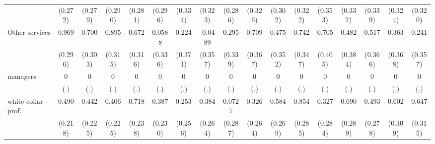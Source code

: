{\begin{tabular}{l*{16}{c}}
                    &     (0.272)         &     (0.279)         &     (0.290)         &     (0.281)         &     (0.296)         &     (0.334)         &     (0.323)         &     (0.286)         &     (0.326)         &     (0.302)         &     (0.322)         &     (0.353)         &     (0.337)         &     (0.339)         &     (0.324)         &     (0.320)         \\
[1em]
Other services      &       0.969\sym{**} &       0.700\sym{*}  &       0.895\sym{**} &       0.672\sym{*}  &      0.0588         &       0.224         &     -0.0489         &       0.295         &       0.709         &       0.475         &       0.742\sym{*}  &       0.705         &       0.482         &       0.517         &       0.363         &       0.241         \\
                    &     (0.296)         &     (0.303)         &     (0.315)         &     (0.316)         &     (0.336)         &     (0.371)         &     (0.357)         &     (0.339)         &     (0.367)         &     (0.352)         &     (0.347)         &     (0.405)         &     (0.384)         &     (0.366)         &     (0.368)         &     (0.357)         \\
[1em]
managers            &           0         &           0         &           0         &           0         &           0         &           0         &           0         &           0         &           0         &           0         &           0         &           0         &           0         &           0         &           0         &           0         \\
                    &         (.)         &         (.)         &         (.)         &         (.)         &         (.)         &         (.)         &         (.)         &         (.)         &         (.)         &         (.)         &         (.)         &         (.)         &         (.)         &         (.)         &         (.)         &         (.)         \\
[1em]
white collar - prof.&       0.490\sym{*}  &       0.442\sym{*}  &       0.406         &       0.718\sym{**} &       0.387         &       0.253         &       0.384         &      0.0727         &       0.326         &       0.584\sym{*}  &       0.854\sym{**} &       0.327         &       0.690\sym{*}  &       0.493         &       0.602         &       0.647\sym{*}  \\
                    &     (0.218)         &     (0.225)         &     (0.225)         &     (0.238)         &     (0.230)         &     (0.256)         &     (0.264)         &     (0.287)         &     (0.264)         &     (0.269)         &     (0.285)         &     (0.284)         &     (0.289)         &     (0.278)         &     (0.309)         &     (0.315)         \\

\end{tabular}}
